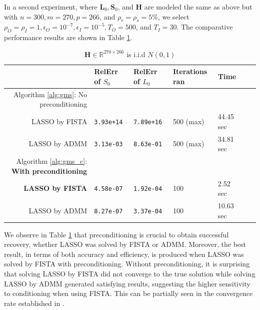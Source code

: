 \documentclass[10pt]{article}  	%
\theoremstyle{definition}
\theoremstyle{definition}
\newcommand{\R}{{\mathbb{R}}}
\newcommand{\mH}{\mathbf{H}}
\newcommand{\mL}{\mathbf{L}}
\newcommand{\mS}{\mathbf{S}}
\theoremstyle{remark}
\begin{document}
In a second experiment, where $\mL_0, \mS_0$, and $\mH$ are modeled the same as above but with $n = 300, m = 270, p = 266$, and  $\rho_r= \rho_s=5\%$, we select $\rho_O=\rho_I=1, \epsilon_O = 10^{-7}, \epsilon_I=10^{-5}, T_O=500$, and  $T_I = 30$. The comparative performance results are shown in Table \ref{tab:con2}.
\begin{table}[htb]
\caption{$\mH\in\R^{270\times266}$ is i.i.d $N(0, 1)$}\label{tab:con2}
\begin{tabular}{rllllll}
&RelErr of $S_0$&RelErr of $L_0$ & Iterations ran & Time\\\hline
Algorithm \ref{alg:gms}: No preconditioning \\
LASSO by FISTA&\verb"3.93e+14"&\verb"7.89e+16"&500 (max) &44.45 sec\\
LASSO by ADMM & \verb"3.13e-03" & \verb"8.63e-01" & 500 (max) &34.81 sec\\

Algorithm \ref{alg:gms_c}: \textbf{With preconditioning} \\
\textbf{LASSO by FISTA} &\verb"4.58e-07" & \verb"1.92e-04"& 100&2.52 sec\\
LASSO by ADMM &\verb"8.27e-07" & \verb"3.37e-04"& 100&10.63 sec\\
\hline
\end{tabular}
\end{table}

We observe in Table \ref{tab:con2} that preconditioning is crucial to obtain successful recovery, whether LASSO was solved by FISTA or ADMM. Moreover, the best result, in terms of both accuracy and efficiency, is produced when LASSO was solved by FISTA with preconditioning. Without preconditioning, it is surprising that solving LASSO by FISTA did not converge to the true solution while solving LASSO by ADMM generated satisfying results, suggesting the higher sensitivity to conditioning when using FISTA. This can be partially seen in the convergence rate established in \cite{BATM2009}.
\end{document}
